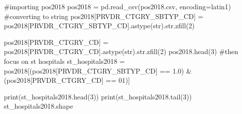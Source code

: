 \documentclass[
  letterpaper,
  DIV=11,
  numbers=noendperiod]{scrartcl}
\newenvironment{Shaded}{\begin{snugshade}}{\end{snugshade}}
\newcommand{\BuiltInTok}[1]{\textcolor[rgb]{0.00,0.23,0.31}{#1}}
\newcommand{\CommentTok}[1]{\textcolor[rgb]{0.37,0.37,0.37}{#1}}
\newcommand{\DecValTok}[1]{\textcolor[rgb]{0.68,0.00,0.00}{#1}}
\newcommand{\NormalTok}[1]{\textcolor[rgb]{0.00,0.23,0.31}{#1}}
\newcommand{\OperatorTok}[1]{\textcolor[rgb]{0.37,0.37,0.37}{#1}}
\newcommand{\StringTok}[1]{\textcolor[rgb]{0.13,0.47,0.30}{#1}}
\begin{document}
\begin{Shaded}
\begin{Highlighting}[]
\CommentTok{\#importing pos2018}
\NormalTok{pos2018 }\OperatorTok{=}\NormalTok{ pd.read\_csv(}\StringTok{\textquotesingle{}pos2018.csv\textquotesingle{}}\NormalTok{, encoding}\OperatorTok{=}\StringTok{\textquotesingle{}latin1\textquotesingle{}}\NormalTok{)}
\CommentTok{\#converting to string}
\NormalTok{pos2018[}\StringTok{\textquotesingle{}PRVDR\_CTGRY\_SBTYP\_CD\textquotesingle{}}\NormalTok{] }\OperatorTok{=}\NormalTok{ pos2018[}\StringTok{\textquotesingle{}PRVDR\_CTGRY\_SBTYP\_CD\textquotesingle{}}\NormalTok{].astype(}\BuiltInTok{str}\NormalTok{).}\BuiltInTok{str}\NormalTok{.zfill(}\DecValTok{2}\NormalTok{)}

\NormalTok{pos2018[}\StringTok{\textquotesingle{}PRVDR\_CTGRY\_CD\textquotesingle{}}\NormalTok{] }\OperatorTok{=}\NormalTok{ pos2018[}\StringTok{\textquotesingle{}PRVDR\_CTGRY\_CD\textquotesingle{}}\NormalTok{].astype(}\BuiltInTok{str}\NormalTok{).}\BuiltInTok{str}\NormalTok{.zfill(}\DecValTok{2}\NormalTok{)}
\NormalTok{pos2018.head(}\DecValTok{3}\NormalTok{)}
\CommentTok{\#then focus on st hospitals }
\NormalTok{st\_hospitals2018 }\OperatorTok{=}\NormalTok{ pos2018[(pos2018[}\StringTok{\textquotesingle{}PRVDR\_CTGRY\_SBTYP\_CD\textquotesingle{}}\NormalTok{] }\OperatorTok{==} \StringTok{\textquotesingle{}1.0\textquotesingle{}}\NormalTok{) }\OperatorTok{\&}\NormalTok{ (pos2018[}\StringTok{\textquotesingle{}PRVDR\_CTGRY\_CD\textquotesingle{}}\NormalTok{] }\OperatorTok{==} \StringTok{\textquotesingle{}01\textquotesingle{}}\NormalTok{)]}

\BuiltInTok{print}\NormalTok{(st\_hospitals2018.head(}\DecValTok{3}\NormalTok{))}
\BuiltInTok{print}\NormalTok{(st\_hospitals2018.tail(}\DecValTok{3}\NormalTok{))}
\NormalTok{st\_hospitals2018.shape}
\end{Highlighting}
\end{Shaded}
\end{document}
